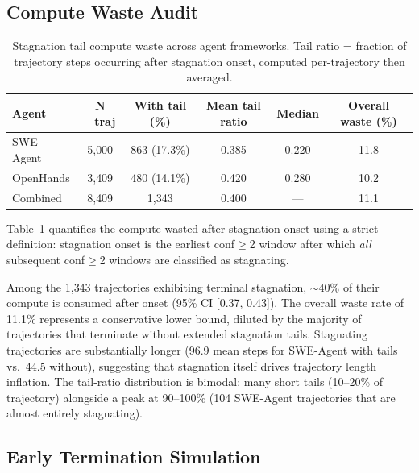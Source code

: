 \documentclass[11pt,a4paper]{article}
\begin{document}
\subsection{Compute Waste Audit}
\label{sec:waste}

\begin{table}[t]
\centering
\caption{Stagnation tail compute waste across agent frameworks. Tail ratio = fraction of trajectory steps occurring after stagnation onset, computed per-trajectory then averaged.}
\label{tab:waste}
\begin{tabular}{lccccc}
\toprule
\textbf{Agent} & $\boldsymbol{N}$\textbf{\_traj} & \textbf{With tail (\%)} & \textbf{Mean tail ratio} & \textbf{Median} & \textbf{Overall waste (\%)} \\
\midrule
SWE-Agent & 5{,}000 & 863 (17.3\%) & 0.385 & 0.220 & 11.8 \\
OpenHands & 3{,}409 & 480 (14.1\%) & 0.420 & 0.280 & 10.2 \\
\midrule
Combined & 8{,}409 & 1{,}343 & 0.400 & --- & 11.1 \\
\bottomrule
\end{tabular}
\end{table}

Table~\ref{tab:waste} quantifies the compute wasted after stagnation onset using a strict definition: stagnation onset is the earliest conf$\geq$2 window after which \emph{all} subsequent conf$\geq$2 windows are classified as stagnating.

Among the 1{,}343 trajectories exhibiting terminal stagnation, $\sim$40\% of their compute is consumed after onset (95\% CI [0.37, 0.43]).
The overall waste rate of 11.1\% represents a conservative lower bound, diluted by the majority of trajectories that terminate without extended stagnation tails.
Stagnating trajectories are substantially longer (96.9 mean steps for SWE-Agent with tails vs.\ 44.5 without), suggesting that stagnation itself drives trajectory length inflation.
The tail-ratio distribution is bimodal: many short tails (10--20\% of trajectory) alongside a peak at 90--100\% (104 SWE-Agent trajectories that are almost entirely stagnating).

\subsection{Early Termination Simulation}
\label{sec:et}
\end{document}
